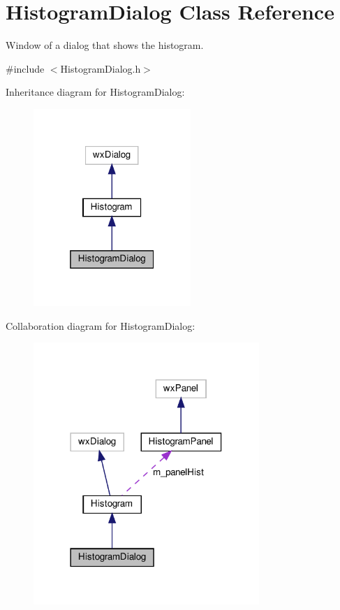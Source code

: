 \hypertarget{classHistogramDialog}{}\section{Histogram\+Dialog Class Reference}
\label{classHistogramDialog}


Window of a dialog that shows the histogram.  




{\ttfamily \#include $<$Histogram\+Dialog.\+h$>$}



Inheritance diagram for Histogram\+Dialog\+:\nopagebreak
\begin{figure}[H]
\begin{center}
\leavevmode
\includegraphics[width=169pt]{classHistogramDialog__inherit__graph}
\end{center}
\end{figure}


Collaboration diagram for Histogram\+Dialog\+:\nopagebreak
\begin{figure}[H]
\begin{center}
\leavevmode
\includegraphics[width=242pt]{classHistogramDialog__coll__graph}
\end{center}
\end{figure}
